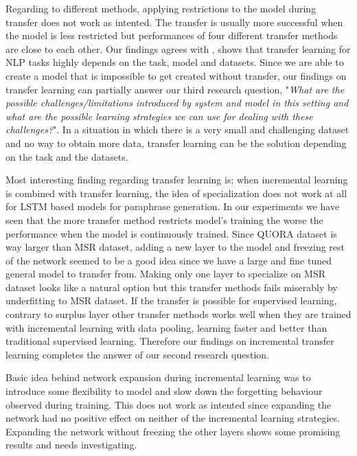 Regarding to different methods, applying restrictions to the model during transfer does not work as intented. The transfer is usually more successful when the model is less restricted but performances of four different transfer methods are close to each other. Our findings agrees with \cite{mou}, shows that transfer learning for NLP tasks highly depends on the task, model and datasets. Since we are able to create a model that is impossible to get created without transfer, our findings on transfer learning can partially answer our third research question, "\textit{What are the possible challenges/limitations introduced by system and model in this setting and what are the possible learning strategies we can use for dealing with these challenges?}". In a situation in which there is a very small and challenging dataset and no way to obtain more data, transfer learning can be the solution depending on the task and the datasets.

Most interesting finding regarding transfer learning is; when incremental learning is combined with transfer learning, the idea of specialization does not work at all for LSTM based models for paraphrase generation. In our experiments we have seen that the more transfer method restricts model's training the worse the performance when the model is continuously trained. Since QUORA dataset is way larger than MSR dataset, adding a new layer to the model and freezing rest of the network seemed to be a good idea since we have a large and fine tuned general model to transfer from. Making only one layer to specialize on MSR dataset looks like a natural option but this transfer methods fails miserably by underfitting to MSR dataset. If the transfer is possible for supervised learning, contrary to surplus layer other transfer methods works well when they are trained with incremental learning with data pooling, learning faster and better than traditional supervised learning. Therefore our findings on incremental transfer learning completes the answer of our second research question.


Basic idea behind network expansion during incremental learning was to introduce some flexibility to model and slow down the forgetting behaviour observed during training. This does not work as intented since expanding the network had no positive effect on neither of the incremental learning strategies. Expanding the network without freezing the other layers shows some promising results and needs investigating.





